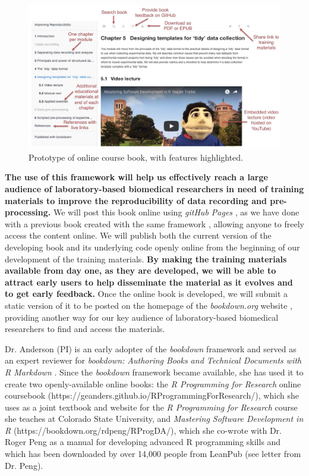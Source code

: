 \documentclass[pdftex,english,11.5pt,parskip=half]{scrartcl}
\begin{document}
\begin{figure}[t] \includegraphics[width =
\textwidth]{figures/book_prototype.jpg} \caption{Prototype of online course
book, with features highlighted.} \label{fig:prototype} \end{figure}

\textbf{The use of this framework will help us effectively reach a large
audience of laboratory-based biomedical researchers in need of training materials to improve the reproducibility of data
recording and pre-processing.} We will 
post this book online using \textit{gitHub Pages} \cite{gitpages}, as we have done
with a previous book created with the same framework \cite{andersoncoursebook}, allowing anyone to
freely access the content online. We will publish both the current version of the developing book and its underlying code openly online from the beginning
of our development of the training materials. \textbf{By making the training
materials available from day one, as they are developed, we will be able to
attract early users to help disseminate the material as it evolves and to get early feedback.} Once the online
book is developed, we will submit a static version of it to be posted
on the homepage of the \textit{bookdown.org} website \cite{bookdownorg}, providing
another way for our key audience of laboratory-based biomedical researchers to find and access the materials.

Dr. Anderson (PI) is an early adopter of the \textit{bookdown} framework and served as an expert reviewer for \textit{bookdown: Authoring Books
and Technical Documents with R Markdown} \cite{xie2016bookdown}. Since
the \textit{bookdown} framework became available, she has used it to create two openly-available online
books: the \textit{R Programming for Research} online coursebook (https://geanders.github.io/RProgrammingForResearch/), which she uses
as a joint textbook and website for the \textit{R Programming for Research}
course she teaches at Colorado State University, and \textit{Mastering
Software Development in R} (https://bookdown.org/rdpeng/RProgDA/), which she co-wrote with Dr. Roger Peng as a manual
for developing advanced R programming skills and which has been downloaded by
over 14,000 people from LeanPub (see letter from Dr. Peng). 
\end{document}

